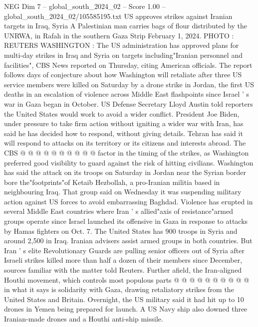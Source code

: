 \begin{textsample}{NEG Dim 7 – global\_south\_2024\_02 – Score 1.00 – global\_south\_2024\_02/105585195.txt}  \label{ex:f7_neg_255}
US approves strikes against Iranian targets in Iraq, Syria A Palestinian man carries bags of flour distributed by the UNRWA, in Rafah in the southern Gaza Strip February 1, 2024.
PHOTO : REUTERS WASHINGTON : The US administration has approved plans for multi-day strikes in Iraq and Syria on targets including"Iranian personnel and facilities", CBS News reported on Thursday, citing American officials.
The report follows days of conjecture about how Washington will retaliate after three US service members were killed on Saturday by a drone strike in Jordan, the first US deaths in an escalation of violence across Middle East flashpoints since Israel ' s war in Gaza began in October.
US Defense Secretary Lloyd Austin told reporters the United States would work to avoid a wider conflict.
President Joe Biden, under pressure to take firm action without igniting a wider war with Iran, has said he has decided how to respond, without giving details.
Tehran has said it will respond to attacks on its territory or its citizens and interests abroad.
The CBS @ @ @ @ @ @ @ @ @ @ factor in the timing of the strikes, as Washington preferred good visibility to guard against the risk of hitting civilians.
Washington has said the attack on its troops on Saturday in Jordan near the Syrian border bore the"footprints"of Ketaib Hezbollah, a pro-Iranian militia based in neighbouring Iraq.
That group said on Wednesday it was suspending military action against US forces to avoid embarrassing Baghdad.
Violence has erupted in several Middle East countries where Iran ' s allied"axis of resistance"armed groups operate since Israel launched its offensive in Gaza in response to attacks by Hamas fighters on Oct. 7.
The United States has 900 troops in Syria and around 2,500 in Iraq.
Iranian advisers assist armed groups in both countries.
But Iran ' s elite Revolutionary Guards are pulling senior officers out of Syria after Israeli strikes killed more than half a dozen of their members since December, sources familiar with the matter told Reuters.
Further afield, the Iran-aligned Houthi movement, which controls most populous parts @ @ @ @ @ @ @ @ @ @ in what it says is solidarity with Gaza, drawing retaliatory strikes from the United States and Britain.
Overnight, the US military said it had hit up to 10 drones in Yemen being prepared for launch.
A US Navy ship also downed three Iranian-made drones and a Houthi anti-ship missile.

\end{textsample}
